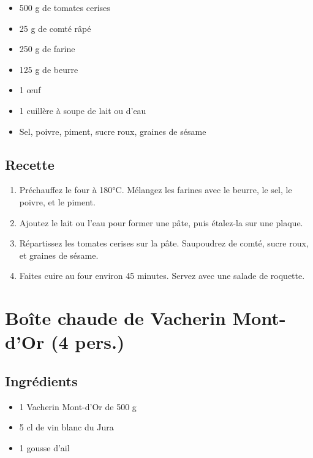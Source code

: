 \begin{itemize}

\item
  500 g de tomates cerises
\item
  25 g de comté râpé
\item
  250 g de farine
\item
  125 g de beurre
\item
  1 œuf
\item
  1 cuillère à soupe de lait ou d'eau
\item
  Sel, poivre, piment, sucre roux, graines de sésame
\end{itemize}

\subsection{Recette}\label{recette-12}

\begin{enumerate}
\def\labelenumi{\arabic{enumi}.}

\item
  Préchauffez le four à 180°C. Mélangez les farines avec le beurre, le
  sel, le poivre, et le piment.
\item
  Ajoutez le lait ou l'eau pour former une pâte, puis étalez-la sur une
  plaque.
\item
  Répartissez les tomates cerises sur la pâte. Saupoudrez de comté,
  sucre roux, et graines de sésame.
\item
  Faites cuire au four environ 45 minutes. Servez avec une salade de
  roquette.
\end{enumerate}

\section{Boîte chaude de Vacherin Mont-d'Or (4
pers.)}\label{bouxeete-chaude-de-vacherin-mont-dor-4-pers.}

\subsection{Ingrédients}\label{ingruxe9dients-20}

\begin{itemize}

\item
  1 Vacherin Mont-d'Or de 500 g
\item
  5 cl de vin blanc du Jura
\item
  1 gousse d'ail
\end{itemize}

